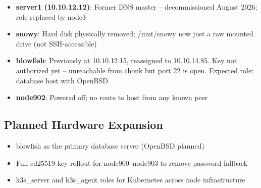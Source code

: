 \begin{itemize}
    \item \textbf{server1 (10.10.12.12)}: Former DNS master -- decommissioned August 2026; role replaced by node3
    
    \item \textbf{snowy}: Hard disk physically removed; /mnt/snowy now just a raw mounted drive (not SSH-accessible)
    
    \item \textbf{blowfish}: Previously at 10.10.12.15, reassigned to 10.10.14.85. Key not authorized yet -- unreachable from chonk but port 22 is open. Expected role: database host with OpenBSD
    
    \item \textbf{node902}: Powered off; no route to host from any known peer
\end{itemize}

\subsection{Planned Hardware Expansion}

\begin{itemize}
    \item blowfish as the primary database server (OpenBSD planned)
    
    \item Full ed25519 key rollout for node900--node903 to remove password fallback
    
    \item k3s\_server and k3s\_agent roles for Kubernetes across node infrastructure
\end{itemize}
